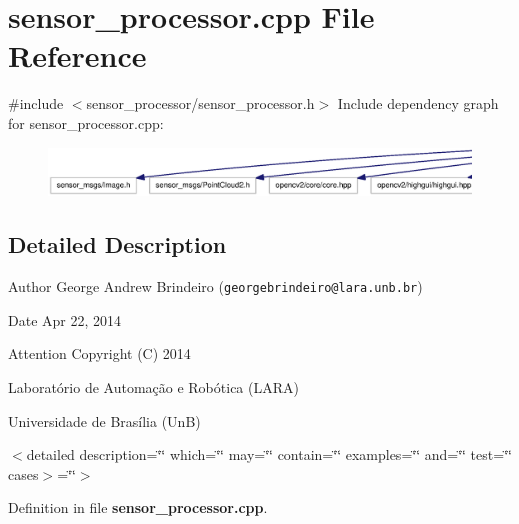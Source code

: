 \section{sensor\-\_\-processor.\-cpp \-File \-Reference}
\label{sensor__processor_8cpp}



\footnotesize  
\normalsize  


{\ttfamily \#include $<$sensor\-\_\-processor/sensor\-\_\-processor.\-h$>$}\*
\-Include dependency graph for sensor\-\_\-processor.\-cpp\-:\nopagebreak
\begin{figure}[H]
\begin{center}
\leavevmode
\includegraphics[width=350pt]{sensor__processor_8cpp__incl}
\end{center}
\end{figure}


\subsection{\-Detailed \-Description}

\footnotesize  
\normalsize \begin{DoxyAuthor}{\-Author}
\-George \-Andrew \-Brindeiro ({\tt georgebrindeiro@lara.\-unb.\-br}) 
\end{DoxyAuthor}
\begin{DoxyDate}{\-Date}
\-Apr 22, 2014
\end{DoxyDate}
\begin{DoxyAttention}{\-Attention}
\-Copyright (\-C) 2014 

\-Laboratório de \-Automação e \-Robótica (\-L\-A\-R\-A) 

\-Universidade de \-Brasília (\-Un\-B)
\end{DoxyAttention}
$<$detailed description=\char`\"{}\char`\"{} which=\char`\"{}\char`\"{} may=\char`\"{}\char`\"{} contain=\char`\"{}\char`\"{} examples=\char`\"{}\char`\"{} and=\char`\"{}\char`\"{} test=\char`\"{}\char`\"{} cases$>$=\char`\"{}\char`\"{}$>$ 

\-Definition in file {\bf sensor\-\_\-processor.\-cpp}.

